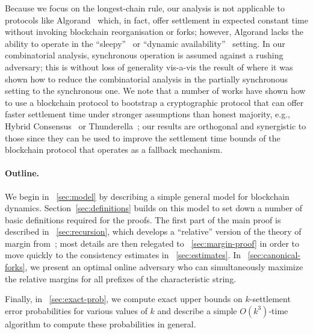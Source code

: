Because we focus on the longest-chain rule, our
analysis is not applicable to protocols like
Algorand~\cite{DBLP:journals/corr/Micali16} which, in fact, offer
settlement in expected constant time without invoking blockchain
reorganisation or forks; however, Algorand lacks the ability to
operate in the ``sleepy''~\cite{DBLP:conf/asiacrypt/PassS17} or
``dynamic availability''~\cite{DBLP:journals/iacr/BadertscherGKRZ18}
setting.
In our combinatorial analysis, synchronous operation is assumed
against a rushing adversary; this is without loss of generality
vis-a-vis the result of \cite{DBLP:conf/eurocrypt/DavidGKR18} where it
was shown how to reduce the combinatorial analysis in the partially
synchronous setting to the synchronous one.  We note that a number of
works have shown how to use a blockchain protocol to bootstrap a
cryptographic protocol that can offer faster settlement time under
stronger assumptions than honest majority, e.g., Hybrid
Consensus~\cite{DBLP:conf/wdag/PassS17} or
Thunderella~\cite{DBLP:conf/eurocrypt/PassS18}; our results are
orthogonal and synergistic to those since they can be used to improve
the settlement time bounds of the blockchain protocol that operates as
a fallback mechanism.

\paragraph{Outline.} We begin in \Section~\ref{sec:model} by describing
a simple general model for blockchain
dynamics. Section~\ref{sec:definitions} builds on this model to set
down a number of basic definitions required for the proofs. The first
part of the main proof is described in \Section~\ref{sec:recursion},
which develops a ``relative'' version of the theory of margin
from~\cite{KRDO17}; most details are then relegated to
\Section~\ref{sec:margin-proof} in order to move quickly to the
consistency estimates in \Section~\ref{sec:estimates}.  In
\Section~\ref{sec:canonical-forks}, we present an optimal online
adversary who can simultaneously maximize the relative margins for all
prefixes of the characteristic string.   Finally, in \Section~\ref{sec:exact-prob}, we
compute exact upper bounds on $k$-settlement error probabilities for
various values of $k$ and describe a simple $O(k^3)$-time algorithm to
compute these probabilities in general.
 

